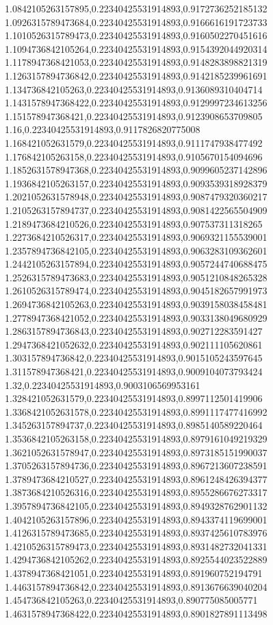 1.0842105263157895,0.22340425531914893,0.9172736252185132
1.0926315789473684,0.22340425531914893,0.9166616191723733
1.1010526315789473,0.22340425531914893,0.9160502270451616
1.1094736842105264,0.22340425531914893,0.9154392044920314
1.1178947368421053,0.22340425531914893,0.9148283898821319
1.1263157894736842,0.22340425531914893,0.9142185239961691
1.134736842105263,0.22340425531914893,0.9136089310404714
1.1431578947368422,0.22340425531914893,0.9129997234613256
1.151578947368421,0.22340425531914893,0.9123908653709805
1.16,0.22340425531914893,0.9117826820775008
1.168421052631579,0.22340425531914893,0.9111747938477492
1.176842105263158,0.22340425531914893,0.9105670154094696
1.1852631578947368,0.22340425531914893,0.9099605237142896
1.1936842105263157,0.22340425531914893,0.9093539318928379
1.2021052631578948,0.22340425531914893,0.9087479320360217
1.2105263157894737,0.22340425531914893,0.9081422565504909
1.2189473684210526,0.22340425531914893,0.907537311318265
1.2273684210526317,0.22340425531914893,0.9069321155539001
1.2357894736842105,0.22340425531914893,0.9063283109362601
1.2442105263157894,0.22340425531914893,0.9057244740688475
1.2526315789473683,0.22340425531914893,0.9051210848265328
1.2610526315789474,0.22340425531914893,0.9045182657991973
1.2694736842105263,0.22340425531914893,0.9039158038458481
1.2778947368421052,0.22340425531914893,0.9033138049680929
1.2863157894736843,0.22340425531914893,0.902712283591427
1.2947368421052632,0.22340425531914893,0.902111105620861
1.303157894736842,0.22340425531914893,0.9015105243597645
1.311578947368421,0.22340425531914893,0.9009104073793424
1.32,0.22340425531914893,0.9003106569953161
1.328421052631579,0.22340425531914893,0.8997112501419906
1.3368421052631578,0.22340425531914893,0.8991117477416992
1.345263157894737,0.22340425531914893,0.8985140589220464
1.3536842105263158,0.22340425531914893,0.8979161049219329
1.3621052631578947,0.22340425531914893,0.8973185151990037
1.3705263157894736,0.22340425531914893,0.8967213607238591
1.3789473684210527,0.22340425531914893,0.8961248426394377
1.3873684210526316,0.22340425531914893,0.8955286676273317
1.3957894736842105,0.22340425531914893,0.8949328762901132
1.4042105263157896,0.22340425531914893,0.8943374119699001
1.4126315789473685,0.22340425531914893,0.8937425610783976
1.4210526315789473,0.22340425531914893,0.8931482732041331
1.4294736842105262,0.22340425531914893,0.8925544023522889
1.4378947368421051,0.22340425531914893,0.891960752194791
1.4463157894736842,0.22340425531914893,0.8913676639040204
1.454736842105263,0.22340425531914893,0.890775085005771
1.4631578947368422,0.22340425531914893,0.8901827891113498
